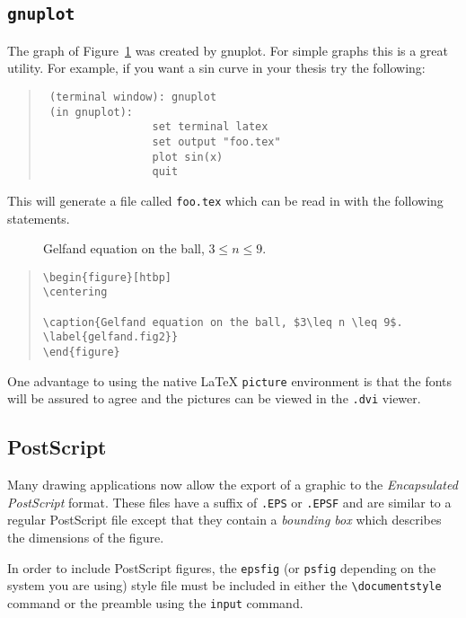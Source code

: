 \subsection{\tt gnuplot}
The graph of Figure~\ref{gelfand.fig2}
 was created by gnuplot. For simple graphs this is a
 great utility.  For example, if you want a sin curve in your thesis
 try the following:
\begin{quote}\tt\singlespace\begin{verbatim}
 (terminal window): gnuplot
 (in gnuplot):
                 set terminal latex
                 set output "foo.tex"
                 plot sin(x)
                 quit
\end{verbatim}\end{quote}
This will generate a file called {\tt foo.tex} which can be read in
with the following statements.
\begin{figure}[htbp]
\centering

\caption{Gelfand equation on the ball, $3\leq n \leq 9$.
\label{gelfand.fig2}}
\end{figure}
\begin{quote}\tt\singlespace\begin{verbatim}
\begin{figure}[htbp]
\centering

\caption{Gelfand equation on the ball, $3\leq n \leq 9$.
\label{gelfand.fig2}}
\end{figure}
\end{verbatim}\end{quote}
One advantage to using the native \LaTeX{} {\tt picture} environment
is that the fonts will be assured to agree and the pictures can be viewed
in the {\tt .dvi} viewer.

\subsection{PostScript}
Many drawing applications now allow the export of a graphic to the
{\em Encapsulated PostScript} format.  These files have a suffix of
{\tt .EPS} or {\tt .EPSF} and are similar to a regular PostScript
file except that they contain a {\em bounding box} which describes
the dimensions of the figure.

In order to include PostScript figures, the {\tt epsfig} (or {\tt psfig}
depending on the system you are using) style file must be included in either
the {\tt\verb|\documentstyle|} command or the preamble using the {\tt input} command.

